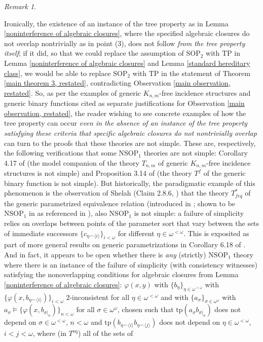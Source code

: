 \documentclass{amsart}
\theoremstyle{definition}
\theoremstyle{remark}
\newtheorem{remark}[theorem]{Remark}
\numberwithin{equation}{section}
\begin{document}
\begin{remark}
\label{noninterference in tree property}

Ironically, the existence of an instance of the tree property as in Lemma \ref{noninterference of algebraic closures}, where the specified algebraic closures do not overlap nontrivially as in point (3), does not follow \textit{from the tree property itself}; if it did, so that we could replace the assumption of $\mathrm{SOP}_{2}$ with $\mathrm{TP}$ in Lemma \ref{noninterference of algebraic closures} and Lemma \ref{standard hereditary class},  we would be able to replace $\mathrm{SOP}_{2}$ with $\mathrm{TP}$ in the statement of Theorem \ref{main theorem 3, restated}, contradicting Observation \ref{main observation, restated}. So, as per the examples of generic $K_{n, m}$-free incidence structures and generic binary functions cited as separate justifications for Observation \ref{main observation, restated}, the reader wishing to see concrete examples of how the tree property can occur \textit{even in the absence of an instance of the tree property satisfying these criteria that specific algebraic closures do not nontrivially overlap} can turn to the proofs that these theories are not simple. These are, respectively, the following verifications that some $\mathrm{NSOP}_{1}$ theories are not simple: Corollary 4.17 of \cite{CoK19} (the model companion of the theory $T_{n,m}$ of generic $K_{n, m}$-free incidence structures is not simple) and Proposition 3.14 of \cite{KR18} (the theory $T^{f}$ of the generic binary function is not simple). But historically, the paradigmatic example of this phenomenon is the observation of Shelah (Claim 2.8.6, \cite{She95}) that the theory $T_{feq}^{*}$ of the generic parametrized equivalence relation (introduced in \cite{She94}; shown to be $\mathrm{NSOP}_1 $ in \cite{SU08} as referenced in \cite{Sh99}), also $\mathrm{NSOP}_{1}$ is not simple: a failure of simplicity relies on overlaps between points of the parameter sort that vary between the sets of immediate successors $\{c_{\eta \smallfrown \langle i \rangle} \}_{i < \omega}$ for different $\eta \in \omega^{< \omega}$. This is exposited as part of more general results on generic parametrizations in Corollary 6.18 of \cite{CR15}. And in fact, it appears to be open whether there is \textit{any} (strictly) $\mathrm{NSOP}_{1}$ theory where there is an instance of the failure of simplicity (with consistency witnesses) satisfying the nonoverlapping conditions for algebraic closures from Lemma \ref{noninterference of algebraic closures}: $\varphi(x, y)$ with $\{b_{\eta}\}_{\eta \in \omega^{< \omega}}$ with $\{\varphi(x, b_{\eta \smallfrown \langle i \rangle}) \}_{i < \omega}$ $2$-inconsistent for all $\eta \in \omega^{< \omega}$ and with $\{a_{\sigma}\}_{\sigma \in \omega^{\omega}}$ with $a_{\sigma} \models \{ \varphi(x, b_{\sigma|_{n}})\}_{n < \omega}$ for all $\sigma \in \omega^{\omega}$, chosen such that $\mathrm{tp}(a_{\sigma}b_{\sigma|_{n}})$ does not depend on $\sigma \in \omega^{<\omega}$, $n < \omega$ and $\mathrm{tp}(b_{\eta \smallfrown \langle i \rangle}b_{\eta \smallfrown \langle j \rangle})$ does not depend on $\eta \in \omega^{< \omega} $,  $i < j < \omega$, where (in $T^{\mathrm{eq}}$) all of the sets of 
\end{remark}
\end{document}
